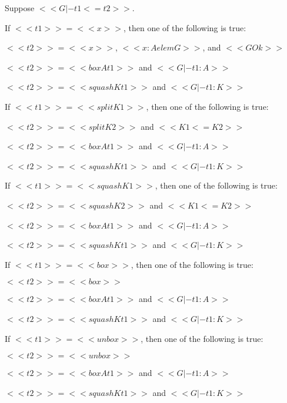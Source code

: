 \begin{lemma}
  \label{lemma:inversion_for_term_precision_for_core_grady}
  Suppose $<<G |- t1 <= t2>>$.
  \begin{enumR}
  \item If $<<t1>> = <<x>>$, then one of the following is true:
    \begin{enumA}
    \item $<<t2>> = <<x>>$, $<<x : A elem G>>$, and $<<G Ok>>$
    \item $<<t2>> = <<box A t1>>$ and $<<G |- t1 : A>>$
    \item $<<t2>> = <<squash K t1>>$ and $<<G |- t1 : K>>$
    \end{enumA}

  \item If $<<t1>> = <<split K1>>$, then one of the following is true:
    \begin{enumA}
    \item $<<t2>> = <<split K2>>$ and $<<K1 <= K2>>$
    \item $<<t2>> = <<box A t1>>$ and $<<G |- t1 : A>>$
    \item $<<t2>> = <<squash K t1>>$ and $<<G |- t1 : K>>$
    \end{enumA}

  \item If $<<t1>> = <<squash K1>>$, then one of the following is true:
    \begin{enumA}
    \item $<<t2>> = <<squash K2>>$ and $<<K1 <= K2>>$
    \item $<<t2>> = <<box A t1>>$ and $<<G |- t1 : A>>$
    \item $<<t2>> = <<squash K t1>>$ and $<<G |- t1 : K>>$
    \end{enumA}

  \item If $<<t1>> = <<box>>$, then one of the following is true:
    \begin{enumA}
    \item $<<t2>> = <<box>>$
    \item $<<t2>> = <<box A t1>>$ and $<<G |- t1 : A>>$
    \item $<<t2>> = <<squash K t1>>$ and $<<G |- t1 : K>>$
    \end{enumA}

  \item If $<<t1>> = <<unbox>>$, then one of the following is true:
    \begin{enumA}
    \item $<<t2>> = <<unbox>>$
    \item $<<t2>> = <<box A t1>>$ and $<<G |- t1 : A>>$
    \item $<<t2>> = <<squash K t1>>$ and $<<G |- t1 : K>>$
    \end{enumA}


\end{enumR}
\end{lemma}
